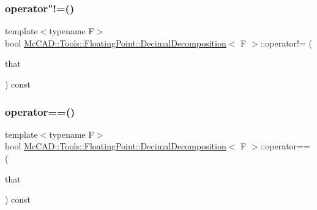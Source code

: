 \subsubsection{\texorpdfstring{operator"!=()}{operator!=()}}
{\footnotesize\ttfamily template$<$typename F$>$ \\
bool \hyperlink{classMcCAD_1_1Tools_1_1FloatingPoint_1_1DecimalDecomposition}{Mc\+C\+A\+D\+::\+Tools\+::\+Floating\+Point\+::\+Decimal\+Decomposition}$<$ F $>$\+::operator!= (\begin{DoxyParamCaption}\item[{const \hyperlink{classMcCAD_1_1Tools_1_1FloatingPoint_1_1DecimalDecomposition}{Decimal\+Decomposition}$<$ F $>$ \&}]{that }\end{DoxyParamCaption}) const}

\mbox{\label{classMcCAD_1_1Tools_1_1FloatingPoint_1_1DecimalDecomposition_aede42da95040d0b77404ed5ecc8dd65e}} 
\subsubsection{\texorpdfstring{operator==()}{operator==()}}
{\footnotesize\ttfamily template$<$typename F$>$ \\
bool \hyperlink{classMcCAD_1_1Tools_1_1FloatingPoint_1_1DecimalDecomposition}{Mc\+C\+A\+D\+::\+Tools\+::\+Floating\+Point\+::\+Decimal\+Decomposition}$<$ F $>$\+::operator== (\begin{DoxyParamCaption}\item[{const \hyperlink{classMcCAD_1_1Tools_1_1FloatingPoint_1_1DecimalDecomposition}{Decimal\+Decomposition}$<$ F $>$ \&}]{that }\end{DoxyParamCaption}) const}

\mbox{\label{classMcCAD_1_1Tools_1_1FloatingPoint_1_1DecimalDecomposition_afb97c43fc8512ba3fbf24fde56966e88}} 
